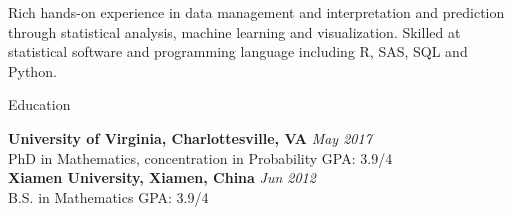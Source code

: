 \documentclass{resume} %
\begin{document}
Rich hands-on experience in data management and interpretation and prediction through statistical analysis, machine learning and visualization. Skilled at statistical software and programming language including R, SAS, SQL and Python.



\begin{rSection}{Education}

{\bf University of Virginia, Charlottesville, VA} \hfill {\em May 2017} \\ 
PhD in Mathematics, concentration in Probability \hspace{11mm}  GPA: 3.9/4  \\
{\bf Xiamen University, Xiamen, China} \hfill {\em Jun 2012} \\ 
B.S. in Mathematics \hspace{65mm} GPA: 3.9/4\\
\end{rSection}

\end{document}
